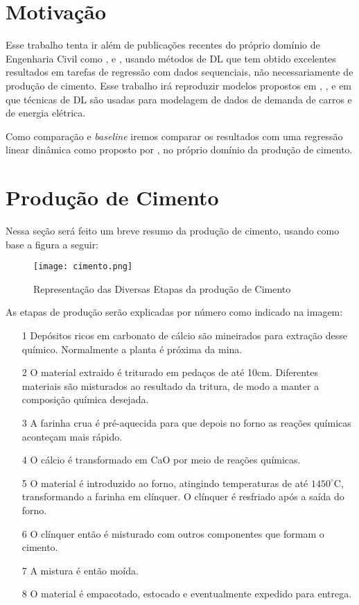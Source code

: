 \section {Motivação}

Esse trabalho tenta ir além de publicações recentes do próprio domínio de Engenharia Civil como \cite{cementnn1},
\cite{cementnn2} e \cite{cementml}, usando métodos de DL que tem
obtido excelentes resultados em tarefas de
regressão com dados sequenciais, não necessariamente de produção de cimento. Esse trabalho irá reproduzir modelos
propostos em \cite{ubertime}, \cite{energylstm}, \cite{deepar} e \cite{deepfactors} em que
técnicas de DL são usadas para modelagem de dados de demanda de carros e de energia elétrica. 

Como comparação e \textit{baseline} iremos comparar os resultados com uma regressão linear dinâmica como proposto por \cite{greciaLin},
no próprio domínio da produção de cimento.

\section{Produção de Cimento}
\label{sec:producao}

Nessa seção será feito um breve resumo da produção de cimento, usando como base a figura a seguir: \\ 

\begin{figure}[H]
\centering
\texttt{[image: cimento.png]}
\caption{Representação das Diversas Etapas da produção de Cimento \citep{cementroadmap}}
\end{figure}


As etapas de produção serão explicadas por número como indicado na imagem: \\

\begin{itemize}

\item[1] Depósitos ricos em carbonato de cálcio são mineirados para extração desse químico. Normalmente a planta é próxima da mina.
\item[2] O material extraido é triturado em pedaços de até 10cm. Diferentes materiais são misturados ao resultado da tritura, de modo a manter a composição química desejada. 
\item[3] A farinha crua é pré-aquecida para que depois no forno as reações químicas aconteçam mais rápido. 
\item[4] O cálcio é transformado em CaO por meio de reações químicas.  
\item[5] O material é introduzido ao forno, atingindo temperaturas de até $1450^\circ$C, transformando a farinha em clínquer. O clínquer é resfriado após a saída do forno. 
\item[6] O clínquer então é misturado com outros componentes que formam o cimento.
\item[7] A mistura é então moída.
\item[8] O material é empacotado, estocado e eventualmente expedido para entrega.

\end{itemize}

